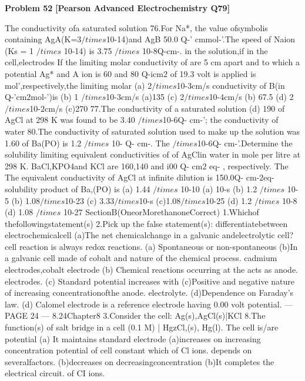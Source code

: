 \begin{problembox}
\textbf{Problem 52} \hfill \textbf{[Pearson Advanced Electrochemistry Q79]}
\label{q:ext-pearson-52}

The conductivity ofa saturated solution
76.For Na*, the value ofsymbolis
containing AgA(K=3$/times$10-14)and AgB
50.0 Q-' cmmol-'.The speed of Naion
(Ks = 1 $/times$ 10-14) is 3.75 $/times$ 10-8Q-cm-.
in the solution,if in the cell,electrodes
If the limiting molar conductivity of
are 5 cm apart and to which a potential
Ag* and A ion is 60 and 80 Q-icm$2$
of 19.3 volt is applied is
mol',respectively,the limiting molar
(a) 2$/times$10-3cm/s
conductivity of B(in Q-'cm$2$mol-')is
(b) 1 $/times$10-3cm/s
(a)135
(c) 2$/times$10-4cm/s
(b) 67.5
(d) 2$/times$10-$2$cm/s
(c)270
77.The conductivity of a saturated solution
(d) 190
of AgCl at 298 K was found to be 3.40
$/times$10-6Q- cm-'; the conductivity of water
80.The conductivity of saturated solution
used to make up the solution was 1.60
of Ba(PO) is 1.2 $/times$ 10- Q-  cm-. The
$/times$10-6Q- cm-'.Determine the solubility
limiting equivalent conductivities of
of AgClin water in mole per litre at 298 K.
BaCl,KPO4and KCl are 160,140
and i00 Q-  cm$2$ eq- , respectively. The
The equivalent conductivity of AgCl at
infinite dilution is 150.0Q- cm-$2$eq-
solubility product of Ba,(PO) is
(a) 1.44 $/times$ 10-10
(a) 10-s
(b) 1.2 $/times$ 10-5
(b) 1.08$/times$10-23
(c) 3.33$/times$10-s
(c)1.08$/times$10-25
(d) 1.2 $/times$ 10-8
(d) 1.08 $/times$ 10-27
SectionB(OneorMorethanoneCorrect)
1.Whichof thefollowingstatement(s)
2.Pick up the false statement(s):
differentiatebetween electrochemicalcell
(a)The net chemicalchange in a galvanic
andelectrolytic cell?
cell reaction is always redox reactions.
(a) Spontaneous or non-spontaneous
(b)In a galvanic cell made of cobalt and
nature of the chemical process.
cadmium electrodes,cobalt electrode
(b) Chemical reactions occurring at the
acts as anode.
electrodes.
(c) Standard potential increases with
(c)Positive and negative nature of
increasing
concentrationofthe
anode.
electrolyte.
(d)Dependence on Faraday's law.
(d) Calomel electrode is a reference
electrode having 0.00 volt potential.
--- PAGE 24 ---
8.24Chapter8
3.Consider the cell: Ag(s),AgCl(s)|KCl
8.The function(s) of salt bridge in a cell
(0.1 M) | HgzCl,(s), Hg(l). The cell
is/are
potential
(a) It maintains standard electrode
(a)increases on increasing concentration
potential of cell constant which
of Cl ions.
depends on severalfactors.
(b)decreases on decreasingconcentration
(b)It completes the electrical circuit.
of CI ions.

\end{problembox}
